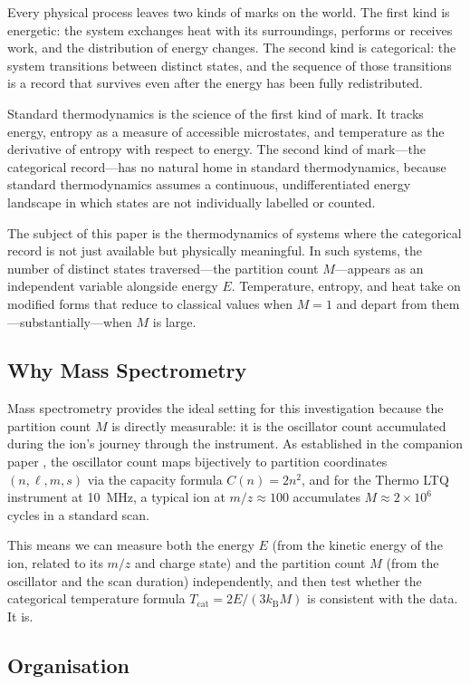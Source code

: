 \documentclass[twocolumn,10pt]{article}
\newcommand{\kB}{k_{\mathrm{B}}}
\newcommand{\Tcat}{T_{\mathrm{cat}}}
\begin{document}
Every physical process leaves two kinds of marks on the world. The first kind is energetic: the system exchanges heat with its surroundings, performs or receives work, and the distribution of energy changes. The second kind is categorical: the system transitions between distinct states, and the sequence of those transitions is a record that survives even after the energy has been fully redistributed.

Standard thermodynamics is the science of the first kind of mark. It tracks energy, entropy as a measure of accessible microstates, and temperature as the derivative of entropy with respect to energy. The second kind of mark---the categorical record---has no natural home in standard thermodynamics, because standard thermodynamics assumes a continuous, undifferentiated energy landscape in which states are not individually labelled or counted.

The subject of this paper is the thermodynamics of systems where the categorical record is not just available but physically meaningful. In such systems, the number of distinct states traversed---the partition count $M$---appears as an independent variable alongside energy $E$. Temperature, entropy, and heat take on modified forms that reduce to classical values when $M = 1$ and depart from them---substantially---when $M$ is large.

\subsection{Why Mass Spectrometry}

Mass spectrometry provides the ideal setting for this investigation because the partition count $M$ is directly measurable: it is the oscillator count accumulated during the ion's journey through the instrument. As established in the companion paper \citep{partitioncounting}, the oscillator count maps bijectively to partition coordinates $(n, \ell, m, s)$ via the capacity formula $C(n) = 2n^2$, and for the Thermo LTQ instrument at 10~MHz, a typical ion at $m/z \approx 100$ accumulates $M \approx 2 \times 10^6$ cycles in a standard scan.

This means we can measure both the energy $E$ (from the kinetic energy of the ion, related to its $m/z$ and charge state) and the partition count $M$ (from the oscillator and the scan duration) independently, and then test whether the categorical temperature formula $\Tcat = 2E/(3\kB M)$ is consistent with the data. It is.

\subsection{Organisation}
\end{document}
